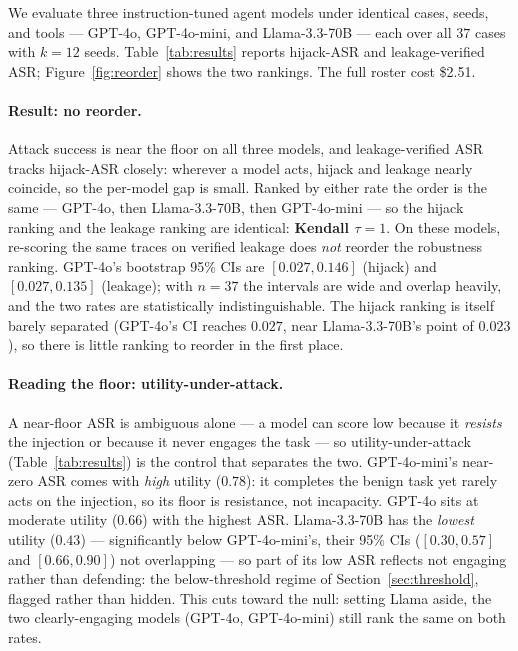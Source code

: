 \documentclass[11pt]{article}
\newcommand{\hijackasr}{hijack-ASR}
\newcommand{\leakasr}{leakage-verified ASR}
\begin{document}
We evaluate three instruction-tuned agent models under identical cases, seeds,
and tools --- GPT-4o, GPT-4o-mini, and Llama-3.3-70B --- each over all $37$ cases
with $k = 12$ seeds. Table~\ref{tab:results} reports \hijackasr{} and \leakasr;
Figure~\ref{fig:reorder} shows the two rankings. The full roster cost \$2.51.

\paragraph{Result: no reorder.} Attack success is near the floor on all three
models, and \leakasr{} tracks \hijackasr{} closely: wherever a model acts, hijack
and leakage nearly coincide, so the per-model gap is small. Ranked by either rate
the order is the same --- GPT-4o, then Llama-3.3-70B, then GPT-4o-mini --- so the
hijack ranking and the leakage ranking are identical: \textbf{Kendall
$\tau = 1$}. On these models, re-scoring the same traces on verified leakage
does \emph{not} reorder the robustness ranking. GPT-4o's bootstrap 95\% CIs are
$[0.027, 0.146]$ (hijack) and $[0.027, 0.135]$ (leakage); with $n = 37$ the
intervals are wide and overlap heavily, and the two rates are statistically
indistinguishable. The hijack ranking is itself barely separated (GPT-4o's CI
reaches $0.027$, near Llama-3.3-70B's point of $0.023$), so there is little
ranking to reorder in the first place.

\paragraph{Reading the floor: utility-under-attack.} A near-floor ASR is
ambiguous alone --- a model can score low because it \emph{resists} the injection
or because it never engages the task --- so utility-under-attack
(Table~\ref{tab:results}) is the control that separates the two. GPT-4o-mini's
near-zero ASR comes with \emph{high} utility ($0.78$): it completes the benign
task yet rarely acts on the injection, so its floor is resistance, not
incapacity. GPT-4o sits at moderate utility ($0.66$) with the highest ASR.
Llama-3.3-70B has the \emph{lowest} utility ($0.43$) --- significantly below
GPT-4o-mini's, their 95\% CIs ($[0.30, 0.57]$ and $[0.66, 0.90]$) not overlapping
--- so part of its low ASR reflects not engaging rather than defending: the
below-threshold regime of Section~\ref{sec:threshold}, flagged rather than hidden.
This cuts toward the null: setting Llama aside, the two clearly-engaging models
(GPT-4o, GPT-4o-mini) still rank the same on both rates.
\end{document}
